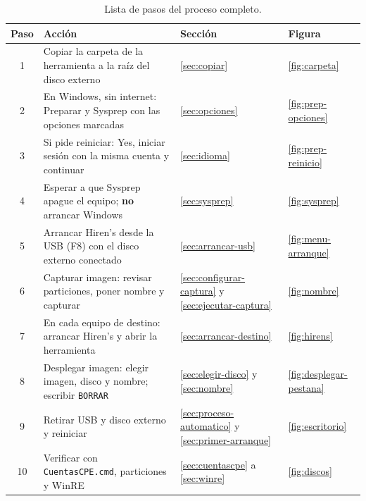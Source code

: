 \documentclass[11pt,a4paper]{report}
\begin{document}
\begin{table}[H]
  \centering
  \small
  \begin{tabularx}{\textwidth}{@{}c X l l@{}}
    \toprule
    \textbf{Paso} & \textbf{Acción} & \textbf{Sección} & \textbf{Figura} \\
    \midrule
    1 & Copiar la carpeta de la herramienta a la raíz del disco externo & \ref{sec:copiar} & \ref{fig:carpeta} \\
    2 & En Windows, sin internet: \textsf{Preparar y Sysprep} con las opciones marcadas & \ref{sec:opciones} & \ref{fig:prep-opciones} \\
    3 & Si pide reiniciar: \textsf{Yes}, iniciar sesión con la misma cuenta y continuar & \ref{sec:idioma} & \ref{fig:prep-reinicio} \\
    4 & Esperar a que Sysprep apague el equipo; \textbf{no} arrancar Windows & \ref{sec:sysprep} & \ref{fig:sysprep} \\
    5 & Arrancar Hiren's desde la USB (\textsf{F8}) con el disco externo conectado & \ref{sec:arrancar-usb} & \ref{fig:menu-arranque} \\
    6 & \textsf{Capturar imagen}: revisar particiones, poner nombre y capturar & \ref{sec:configurar-captura} y \ref{sec:ejecutar-captura} & \ref{fig:nombre} \\
    7 & En cada equipo de destino: arrancar Hiren's y abrir la herramienta & \ref{sec:arrancar-destino} & \ref{fig:hirens} \\
    8 & \textsf{Desplegar imagen}: elegir imagen, disco y nombre; escribir \texttt{BORRAR} & \ref{sec:elegir-disco} y \ref{sec:nombre} & \ref{fig:desplegar-pestana} \\
    9 & Retirar USB y disco externo y reiniciar & \ref{sec:proceso-automatico} y \ref{sec:primer-arranque} & \ref{fig:escritorio} \\
    10 & Verificar con \texttt{CuentasCPE.cmd}, particiones y WinRE & \ref{sec:cuentascpe} a \ref{sec:winre} & \ref{fig:discos} \\
    \bottomrule
  \end{tabularx}
  \caption{Lista de pasos del proceso completo.}
\end{table}
\end{document}
